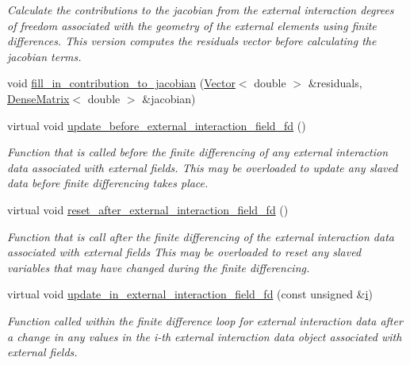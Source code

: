 \begin{DoxyCompactItemize}
\begin{DoxyCompactList}\small\item\em Calculate the contributions to the jacobian from the external interaction degrees of freedom associated with the geometry of the external elements using finite differences. This version computes the residuals vector before calculating the jacobian terms. \end{DoxyCompactList}\item 
void \hyperlink{classoomph_1_1ElementWithExternalElement_ae5fb09552a8271e891438f8d058ca1b8}{fill\+\_\+in\+\_\+contribution\+\_\+to\+\_\+jacobian} (\hyperlink{classoomph_1_1Vector}{Vector}$<$ double $>$ \&residuals, \hyperlink{classoomph_1_1DenseMatrix}{Dense\+Matrix}$<$ double $>$ \&jacobian)
\item 
virtual void \hyperlink{classoomph_1_1ElementWithExternalElement_a040508496c08c90492f104dfeaef142c}{update\+\_\+before\+\_\+external\+\_\+interaction\+\_\+field\+\_\+fd} ()
\begin{DoxyCompactList}\small\item\em Function that is called before the finite differencing of any external interaction data associated with external fields. This may be overloaded to update any slaved data before finite differencing takes place. \end{DoxyCompactList}\item 
virtual void \hyperlink{classoomph_1_1ElementWithExternalElement_a3852c0042b81305b0488fc67f37ad632}{reset\+\_\+after\+\_\+external\+\_\+interaction\+\_\+field\+\_\+fd} ()
\begin{DoxyCompactList}\small\item\em Function that is call after the finite differencing of the external interaction data associated with external fields This may be overloaded to reset any slaved variables that may have changed during the finite differencing. \end{DoxyCompactList}\item 
virtual void \hyperlink{classoomph_1_1ElementWithExternalElement_ae8dac1e4db8e6833fda1150583ce5a21}{update\+\_\+in\+\_\+external\+\_\+interaction\+\_\+field\+\_\+fd} (const unsigned \&\hyperlink{cfortran_8h_adb50e893b86b3e55e751a42eab3cba82}{i})
\begin{DoxyCompactList}\small\item\em Function called within the finite difference loop for external interaction data after a change in any values in the i-\/th external interaction data object associated with external fields. \end{DoxyCompactList}\item 

\end{DoxyCompactItemize}
